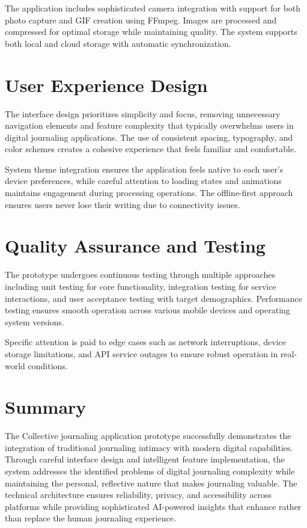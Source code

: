 The application includes sophisticated camera integration with support for both photo capture and GIF creation using FFmpeg. Images are processed and compressed for optimal storage while maintaining quality. The system supports both local and cloud storage with automatic synchronization.

\section{User Experience Design}

The interface design prioritizes simplicity and focus, removing unnecessary navigation elements and feature complexity that typically overwhelms users in digital journaling applications. The use of consistent spacing, typography, and color schemes creates a cohesive experience that feels familiar and comfortable.

System theme integration ensures the application feels native to each user's device preferences, while careful attention to loading states and animations maintains engagement during processing operations. The offline-first approach ensures users never lose their writing due to connectivity issues.

\section{Quality Assurance and Testing}

The prototype undergoes continuous testing through multiple approaches including unit testing for core functionality, integration testing for service interactions, and user acceptance testing with target demographics. Performance testing ensures smooth operation across various mobile devices and operating system versions.

Specific attention is paid to edge cases such as network interruptions, device storage limitations, and API service outages to ensure robust operation in real-world conditions.

\section{Summary}

The Collective journaling application prototype successfully demonstrates the integration of traditional journaling intimacy with modern digital capabilities. Through careful interface design and intelligent feature implementation, the system addresses the identified problems of digital journaling complexity while maintaining the personal, reflective nature that makes journaling valuable. The technical architecture ensures reliability, privacy, and accessibility across platforms while providing sophisticated AI-powered insights that enhance rather than replace the human journaling experience.
